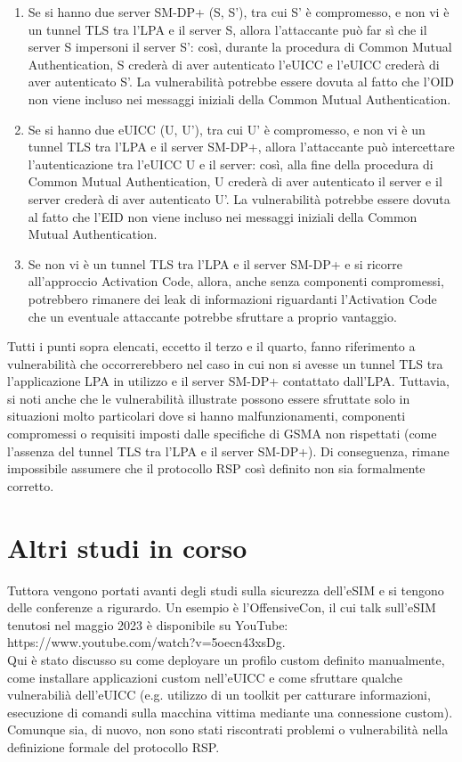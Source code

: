 \documentclass[10pt, oneside]{book}
\begin{document}
\begin{enumerate}
\item Se si hanno due server SM-DP+ (S, S'), tra cui S' è compromesso, e non vi è un tunnel TLS tra l'LPA e il server S, allora l'attaccante può far sì che il server S impersoni il server S': così, durante la procedura di Common Mutual Authentication, S crederà di aver autenticato l'eUICC e l'eUICC crederà di aver autenticato S'. La vulnerabilità potrebbe essere dovuta al fatto che l'OID non viene incluso nei messaggi iniziali della Common Mutual Authentication.
\item Se si hanno due eUICC (U, U'), tra cui U' è compromesso, e non vi è un tunnel TLS tra l'LPA e il server SM-DP+, allora l'attaccante può intercettare l'autenticazione tra l'eUICC U e il server: così, alla fine della procedura di Common Mutual Authentication, U crederà di aver autenticato il server e il server crederà di aver autenticato U'. La vulnerabilità potrebbe essere dovuta al fatto che l'EID non viene incluso nei messaggi iniziali della Common Mutual Authentication.
\item Se non vi è un tunnel TLS tra l'LPA e il server SM-DP+ e si ricorre all'approccio Activation Code, allora, anche senza componenti compromessi, potrebbero rimanere dei leak di informazioni riguardanti l'Activation Code che un eventuale attaccante potrebbe sfruttare a proprio vantaggio.
\end{enumerate}
Tutti i punti sopra elencati, eccetto il terzo e il quarto, fanno riferimento a vulnerabilità che occorrerebbero nel caso in cui non si avesse un tunnel TLS tra l'applicazione LPA in utilizzo e il server SM-DP+ contattato dall'LPA. Tuttavia, si noti anche che le vulnerabilità illustrate possono essere sfruttate solo in situazioni molto particolari dove si hanno malfunzionamenti, componenti compromessi o requisiti imposti dalle specifiche di GSMA non rispettati (come l'assenza del tunnel TLS tra l'LPA e il server SM-DP+). Di conseguenza, rimane impossibile assumere che il protocollo RSP così definito non sia formalmente corretto.

\section{Altri studi in corso}
Tuttora vengono portati avanti degli studi sulla sicurezza dell'eSIM e si tengono delle conferenze a rigurardo. Un esempio è l'OffensiveCon, il cui talk sull'eSIM tenutosi nel maggio 2023 è disponibile su YouTube: https://www.youtube.com/watch?v=5oecn43xsDg.\\
Qui è stato discusso su come deployare un profilo custom definito manualmente, come installare applicazioni custom nell'eUICC e come sfruttare qualche vulnerabilià dell'eUICC (e.g. utilizzo di un toolkit per catturare informazioni, esecuzione di comandi sulla macchina vittima mediante una connessione custom). Comunque sia, di nuovo, non sono stati riscontrati problemi o vulnerabilità nella definizione formale del protocollo RSP.
\end{document}
